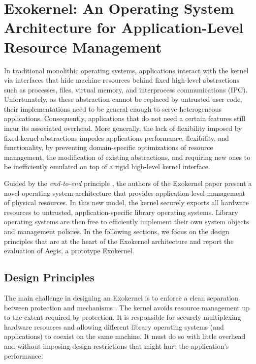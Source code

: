 \section{Exokernel: An Operating System Architecture for Application-Level Resource Management}

In traditional monolithic operating systems, applications interact with the kernel via interfaces that hide machine resources behind fixed high-level abstractions such as processes, files, virtual memory, and interprocess communications (IPC).
Unfortunately, as these abstraction cannot be replaced by untrusted user code, their implementations need to be general enough to serve heterogeneous applications.
Consequently, applications that do not need a certain features still incur its associated overhead.
More generally, the lack of flexibility imposed by fixed kernel abstractions impedes applications performance, flexibility, and functionality, by preventing domain-specific optimizations of resource management, the modification of existing abstractions, and requiring new ones to be inefficiently emulated on top of a rigid high-level kernel interface.

Guided by the \emph{end-to-end} principle \cite{DBLP:journals/tocs/SaltzerRC84}, the authors of the Exokernel paper \cite{DBLP:conf/sosp/EnglerKO95} present a novel operating system architecture that provides application-level management of physical resources.
In this new model, the kernel securely exports all hardware resources to untrusted, application-specific library operating systems.
Library operating systems are then free to efficiently implement their own system objects and management policies.
In the following sections, we focus on the design principles that are at the heart of the Exokernel architecture and report the evaluation of Aegis, a prototype Exokernel.

\subsection{Design Principles}
The main challenge in designing an Exokernel is to enforce a clean separation between protection and mechanisms \cite{DBLP:journals/cacm/LampsonS76}.
The kernel avoids resource management up to the extent required by protection.
It is responsible for securely multiplexing hardware resources and allowing different library operating systems (and applications) to coexist on the same machine.
It must do so with little overhead and without imposing design restrictions that might hurt the application's performance.


